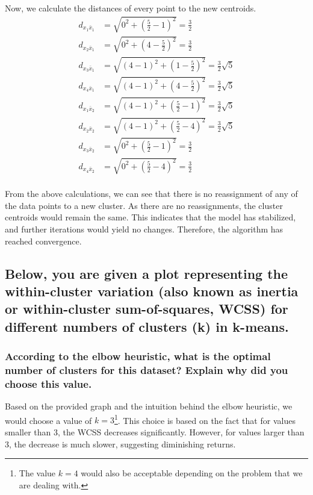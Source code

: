 \documentclass{article}
\begin{document}
Now, we calculate the distances of every point to the new centroids.
\begin{equation}
 \begin{aligned}
 d_{x_1\bar{x}_1} &= \sqrt{0^2 + (\frac{5}{2} - 1)^2} = \frac{3}{2} \\
 d_{x_2\bar{x}_1} &= \sqrt{0^2 + (4 - \frac{5}{2})^2} = \frac{3}{2} \\
 d_{x_3\bar{x}_1} &= \sqrt{(4 - 1)^2 + (1 - \frac{5}{2})^2} = \frac{3}{2}\sqrt{5} \\
 d_{x_4\bar{x}_1} &= \sqrt{(4 - 1)^2 + (4 - \frac{5}{2})^2} = \frac{3}{2}\sqrt{5} \\
 d_{x_1\bar{x}_2} &= \sqrt{(4 - 1)^2 + (\frac{5}{2} - 1)^2} = \frac{3}{2}\sqrt{5} \\
 d_{x_2\bar{x}_2} &= \sqrt{(4 - 1)^2 + (\frac{5}{2} - 4)^2} = \frac{3}{2}\sqrt{5} \\
 d_{x_3\bar{x}_2} &= \sqrt{0^2 + (\frac{5}{2} - 1)^2} = \frac{3}{2} \\
 d_{x_4\bar{x}_2} &= \sqrt{0^2 + (\frac{5}{2} - 4)^2} = \frac{3}{2} \\
 \end{aligned}
\end{equation}

From the above calculations, we can see that there is no reassignment of any of the data points to a new cluster. As there are no reassignments, the cluster centroids would remain the same. This indicates that the model has stabilized, and further iterations would yield no changes. Therefore, the algorithm has reached convergence.

\subsection{Below, you are given a plot representing the within-cluster variation (also known as inertia or within-cluster sum-of-squares, WCSS) for different numbers of clusters (k) in k-means.}
\subsubsection{According to the elbow heuristic, what is the optimal number of clusters for this dataset? Explain why did you choose this value.}
Based on the provided graph and the intuition behind the elbow heuristic, we would choose a value of $k = 3$\footnote{The value $k = 4$ would also be acceptable depending on the problem that we are dealing with.}. This choice is based on the fact that for values smaller than 3, the WCSS decreases significantly. However, for values larger than 3, the decrease is much slower, suggesting diminishing returns.
\end{document}
